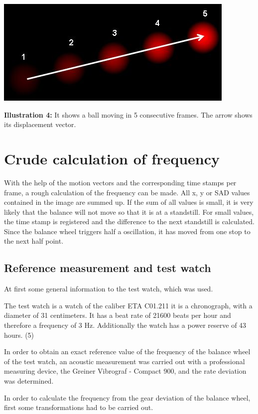 \documentclass[12pt, a4paper]{report}
\begin{document}
\noindent
\begin{center}
\includegraphics[scale=0.55]{Images/optical_flow_basic1.jpg}

{\bf Illustration 4:}  It shows a ball moving in 5 consecutive frames. The arrow shows its displacement vector.
\end{center}

\bigskip
\section{Crude calculation of frequency}
With the help of the motion vectors and the corresponding time stamps per frame, a rough calculation of the frequency can be made.
All x, y or SAD values contained in the image are summed up. If the sum of all values is small, it is very likely that the balance will not move so that it is at a standstill.
For small values, the time stamp is registered and the difference to the next standstill is calculated.
Since the balance wheel triggers half a oscillation, it has moved from one stop to the next half point.

\subsection{Reference measurement and test watch}
At first some general information to the test watch, which was used.

The test watch is a watch of the caliber ETA C01.211 it is a chronograph, with a diameter of 31 centimeters. It has a beat rate of 21600 beats per hour and therefore a frequency of 3 Hz. Additionally the watch has a power reserve of 43 hours. (5)

In order to obtain an exact reference value of the frequency of the balance wheel of the test watch, an acoustic measurement was carried out with a professional measuring device, the Greiner Vibrograf - Compact 900, and the rate deviation was determined. 

In order to calculate the frequency from the gear deviation of the balance wheel, first some transformations had to be carried out. 
\end{document}
